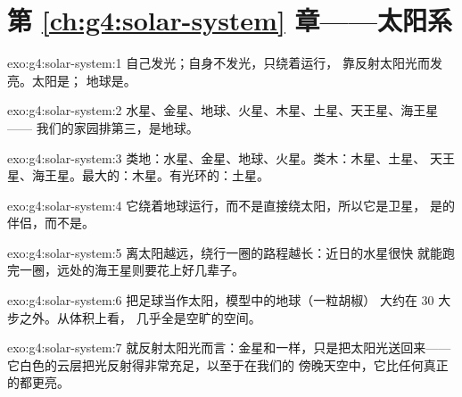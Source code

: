 \section*{第 \ref{ch:g4:solar-system} 章——太阳系}

\begin{solution}{exo:g4:solar-system:1}
自己发光；自身不发光，只绕着运行，
靠反射太阳光而发亮。太阳是；
地球是。
\end{solution}

\begin{solution}{exo:g4:solar-system:2}
水星、金星、地球、火星、木星、土星、天王星、海王星——
我们的家园排第三，是地球。
\end{solution}

\begin{solution}{exo:g4:solar-system:3}
类地：水星、金星、地球、火星。类木：木星、土星、
天王星、海王星。最大的：木星。有光环的：土星。
\end{solution}

\begin{solution}{exo:g4:solar-system:4}
它绕着地球运行，而不是直接绕太阳，所以它是卫星，
是的伴侣，而不是。
\end{solution}

\begin{solution}{exo:g4:solar-system:5}
离太阳越远，绕行一圈的路程越长：近日的水星很快
就能跑完一圈，远处的海王星则要花上好几辈子。
\end{solution}

\begin{solution}{exo:g4:solar-system:6}
把足球当作太阳，模型中的地球（一粒胡椒）
大约在 $30$ 大步之外。从体积上看，
几乎全是空旷的空间。
\end{solution}

\begin{solution}{exo:g4:solar-system:7}
就反射太阳光而言：金星和一样，只是把太阳光送回来——
它白色的云层把光反射得非常充足，以至于在我们的
傍晚天空中，它比任何真正的都更亮。
\end{solution}

